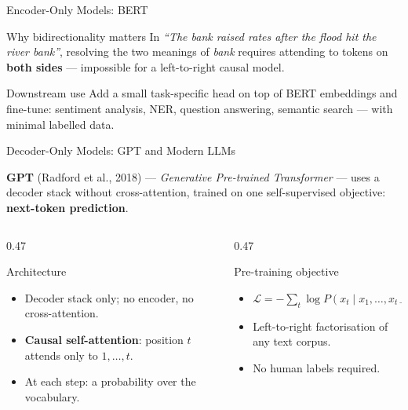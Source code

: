 \documentclass[aspectratio=169]{beamer}
\begin{document}
%
%
\begin{frame}{Encoder-Only Models: BERT}
\begin{exampleblock}{Why bidirectionality matters}
  In \textit{``The bank raised rates after the flood hit the river
  bank''}, resolving the two meanings of \emph{bank} requires
  attending to tokens on \textbf{both sides} --- impossible for a
  left-to-right causal model.
\end{exampleblock}

\medskip
\begin{block}{Downstream use}
  Add a small task-specific head on top of BERT embeddings and
  fine-tune: sentiment analysis, NER, question answering,
  semantic search --- with minimal labelled data.
\end{block}

\end{frame}
%
%
\begin{frame}{Decoder-Only Models: GPT and Modern LLMs}

\textbf{GPT} (Radford et al., 2018) --- \emph{Generative Pre-trained
Transformer} --- uses a decoder stack without cross-attention, trained
on one self-supervised objective: \textbf{next-token prediction}.

\medskip
\begin{columns}[T]
  \begin{column}{0.47\textwidth}
    \begin{block}{Architecture}
      \begin{itemize}
        \item Decoder stack only; no encoder, no cross-attention.
        \item \textbf{Causal self-attention}: position $t$ attends
              only to $1,\ldots,t$.
        \item At each step: a probability over the vocabulary.
      \end{itemize}
    \end{block}
  \end{column}

  \begin{column}{0.47\textwidth}
    \begin{block}{Pre-training objective}
      \begin{itemize}
        \item $\mathcal{L} = -\sum_{t} \log P(x_t \mid x_1,\ldots,x_{t-1})$
        \item Left-to-right factorisation of any text corpus.
        \item No human labels required.
      \end{itemize}
    \end{block}
  \end{column}
\end{columns}
\end{frame}
\end{document}
